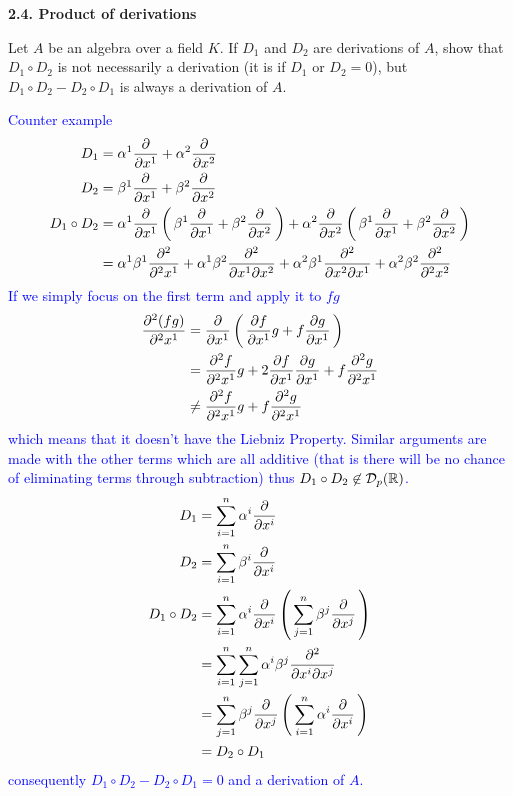 \documentclass[10pt,a4paper]{report}
\newcommand{\BLUE}[1]{\textcolor{blue}{#1}}
\begin{document}
\newpage
\noindent \textbf{2.4. Product of derivations}

\noindent Let $A$ be an algebra over a field $K$.  If $D_1$ and $D_2$ are derivations of $A$, show that $D_1 \circ D_2$ is not necessarily a derivation (it is if $D_1$ or $D_2=0$), but $D_1\circ D_2 - D_2\circ D_1$ is always a derivation of $A$.

\BLUE{Counter example
\begin{align*}
	D_1 &= \alpha^1\frac{\partial }{\partial x^1}+\alpha^2\frac{\partial }{\partial x^2}\\
	D_2 &= \beta^1\frac{\partial }{\partial x^1}+\beta^2\frac{\partial }{\partial x^2}\\
	D_1 \circ D_2 &= \alpha^1\frac{\partial }{\partial x^1}\left (\, \beta^1\frac{\partial }{\partial x^1}+\beta^2\frac{\partial }{\partial x^2} \,\right )+\alpha^2\frac{\partial }{\partial x^2}\left (\, \beta^1\frac{\partial }{\partial x^1}+\beta^2\frac{\partial }{\partial x^2} \,\right )\\
	&= \alpha^1\beta^1 \frac{\partial^2}{\partial^2 x^1}+\alpha^1\beta^2\frac{\partial^2}{\partial x^1 \partial x^2}+\alpha^2\beta^1\frac{\partial^2}{\partial x^2 \partial x^1}+\alpha^2\beta^2\frac{\partial^2}{\partial^2 x^2}\\
\end{align*}If we simply focus on the first term and apply it to $fg$
\begin{align*}
	\frac{\partial^2 (fg)}{\partial^2 x^1} &= \frac{\partial}{\partial x^1}\left (\, \frac{\partial f}{\partial x^1}g+f\frac{\partial g}{\partial x^1} \,\right ) \\
	&= \frac{\partial^2 f}{\partial^2 x^1}g+2\frac{\partial f}{\partial x^1}\frac{\partial g}{\partial x^1} + f\frac{\partial^2 g}{\partial^2 x^1} \\
	&\ne \frac{\partial^2 f}{\partial^2 x^1}g + f\frac{\partial^2 g}{\partial^2 x^1}
\end{align*}which means that it doesn't have the Liebniz Property.  Similar arguments are made with the other terms which are all additive (that is there will be no chance of eliminating terms through subtraction) thus $D_1 \circ D_2 \not \in \mathcal{D}_p(\mathbb{R})$.
\begin{align*}
	D_1 &=\sum_{i=1}^n \alpha^i\frac{\partial }{\partial x^i} \\
	D_2 &= \sum_{i=1}^n \beta^i\frac{\partial }{\partial x^i} \\
	D_1 \circ D_2 &= \sum_{i=1}^n \alpha^i\frac{\partial }{\partial x^i} \left (\, \sum_{j=1}^n \beta^j \frac{\partial }{\partial x^j}  \,\right ) \\
	&= \sum_{i=1}^n\sum_{j=1}^n \alpha^i  \beta^j \frac{\partial ^2}{\partial x^i \partial x^j}  \\
	 &= \sum_{j=1}^n \beta^j \frac{\partial }{\partial x^j}\left (\, \sum_{i=1}^n \alpha^i\frac{\partial }{\partial x^i}  \,\right ) \\
	&= D_2 \circ D_1
\end{align*}consequently $D_1 \circ D_2 - D_2 \circ D_1 = 0$ and a derivation of $A$.
\\}
\end{document}

